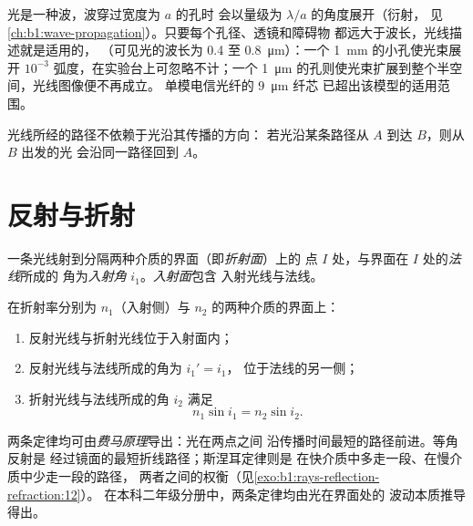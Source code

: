 \begin{remark}[模型的局限]\label{rem:b1:rays-reflection-refraction:limits}
光是一种波，波穿过宽度为 $a$ 的孔时
会以量级为 $\lambda/a$ 的角度展开（衍射，
见\cref{ch:b1:wave-propagation}）。只要每个孔径、透镜和障碍物
都远大于波长，光线描述就是适用的，
（可见光的波长为 \qty{0.4}{} 至 \qty{0.8}{\micro m}）：一个 \qty{1}{mm}
的小孔使光束展开 $10^{-3}$ 弧度，在实验台上可忽略不计；一个
\qty{1}{\micro m} 的孔则使光束扩展到整个半空间，光线图像便不再成立。
单模电信光纤的 \qty{9}{\micro m} 纤芯
已超出该模型的适用范围。
\end{remark}

\begin{proposition}[光路可逆]\label{prop:b1:rays-reflection-refraction:reversibility}
光线所经的路径不依赖于光沿其传播的方向：
若光沿某条路径从 $A$ 到达 $B$，则从 $B$ 出发的光
会沿同一路径回到 $A$。
\end{proposition}
\admitted

\section{反射与折射}

\begin{definition}[入射]\label{def:b1:rays-reflection-refraction:incidence}
一条光线射到分隔两种介质的界面（即\emph{折射面}）上的
点 $I$ 处，与界面在 $I$ 处的\emph{法线}所成的
角为\emph{入射角} $i_1$。\emph{入射面}包含
入射光线与法线。
\end{definition}

\begin{theorem}\label{thm:b1:rays-reflection-refraction:snell}
在折射率分别为 $n_1$（入射侧）与
$n_2$ 的两种介质的界面上：
\begin{enumerate}
  \item 反射光线与折射光线位于入射面内；
  \item 反射光线与法线所成的角为 $i_1' = i_1$，
        位于法线的另一侧；
  \item 折射光线与法线所成的角 $i_2$ 满足
        \[
        n_1 \sin i_1 = n_2 \sin i_2 .
        \]
\end{enumerate}
\end{theorem}
\admitted

\begin{remark}[定律的来源]\label{rem:b1:rays-reflection-refraction:fermat}
两条定律均可由\emph{费马原理}导出：光在两点之间
沿传播时间最短的路径前进。等角反射是
经过镜面的最短折线路径；斯涅耳定律则是
在快介质中多走一段、在慢介质中少走一段的路径，
两者之间的权衡（见\cref{exo:b1:rays-reflection-refraction:12}）。
在本科二年级分册中，两条定律均由光在界面处的
波动本质推导得出。
\end{remark}

